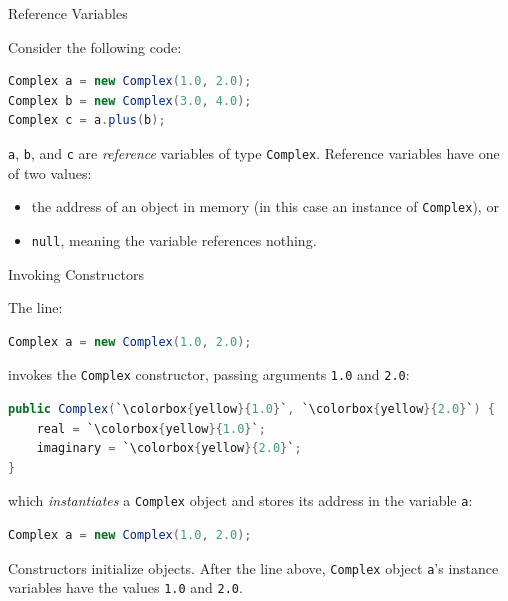 \documentclass{beamer}
\begin{document}
\begin{frame}[fragile]{Reference Variables}


Consider the following code:
\begin{lstlisting}[language=Java]
Complex a = new Complex(1.0, 2.0);
Complex b = new Complex(3.0, 4.0);
Complex c = a.plus(b);
\end{lstlisting}

{\tt a}, {\tt b}, and {\tt c} are {\it reference} variables of type {\tt Complex}.  Reference variables have one of two values:

\begin{itemize}
\item the address of an object in memory (in this case an instance of {\tt Complex}), or
\item {\tt null}, meaning the variable references nothing.
\end{itemize}

\end{frame}

\begin{frame}[fragile]{Invoking Constructors}


The line:
\begin{lstlisting}[language=Java]
Complex a = new Complex(1.0, 2.0);
\end{lstlisting}

invokes the {\tt Complex} constructor, passing arguments {\tt 1.0} and {\tt 2.0}:

\begin{lstlisting}[language=Java,escapechar=`]
public Complex(`\colorbox{yellow}{1.0}`, `\colorbox{yellow}{2.0}`) {
    real = `\colorbox{yellow}{1.0}`;
    imaginary = `\colorbox{yellow}{2.0}`;
}
\end{lstlisting}

which {\it instantiates} a {\tt Complex} object and stores its address in the variable {\tt a}:

\begin{lstlisting}[language=Java]
Complex a = new Complex(1.0, 2.0);
\end{lstlisting}
Constructors initialize objects.  After the line above, {\tt Complex} object {\tt a}'s instance variables have the values {\tt 1.0} and {\tt 2.0}.

\end{frame}
\end{document}
